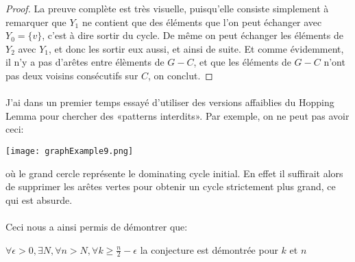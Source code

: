\documentclass[a4paper]{article}
\theoremstyle{definition}
\theoremstyle{remark}
\begin{document}
\begin{proof}
La preuve complète est très visuelle, puisqu'elle consiste simplement à
remarquer que $Y_{1}$ ne contient que des éléments que l'on peut 
échanger avec $Y_{0} = \{v\}$, c'est à dire sortir du cycle. De même  on peut échanger les éléments de $Y_{2}$ avec $Y_{1}$, et donc les sortir 
eux aussi, et ainsi de suite. Et comme évidemment, il n'y a pas d'arêtes
entre élèments de $G-C$, et que les éléments de $G-C$ n'ont pas deux 
voisins consécutifs sur $C$, on conclut.
\end{proof}

\paragraph{}
J'ai dans un premier temps essayé d'utiliser des versions affaiblies du Hopping Lemma pour chercher des «patterns interdits». Par exemple, on ne peut pas avoir ceci:


\texttt{[image: graphExample9.png]}

où le grand cercle représente le dominating cycle initial. En effet il 
suffirait alors de supprimer les arêtes vertes pour obtenir un cycle strictement plus grand, ce qui est absurde.


\paragraph{}
Ceci nous a ainsi permis de démontrer que:

$\forall \epsilon > 0, \exists N, \forall n > N, \forall k \geq \frac{n}{2} - \epsilon$ la conjecture est démontrée pour $k$ et $n$
\end{document}
